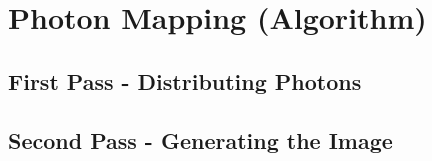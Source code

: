 \chapter{Photon Mapping (Algorithm)}


\section{First Pass - Distributing Photons}

\section{Second Pass - Generating the Image}
